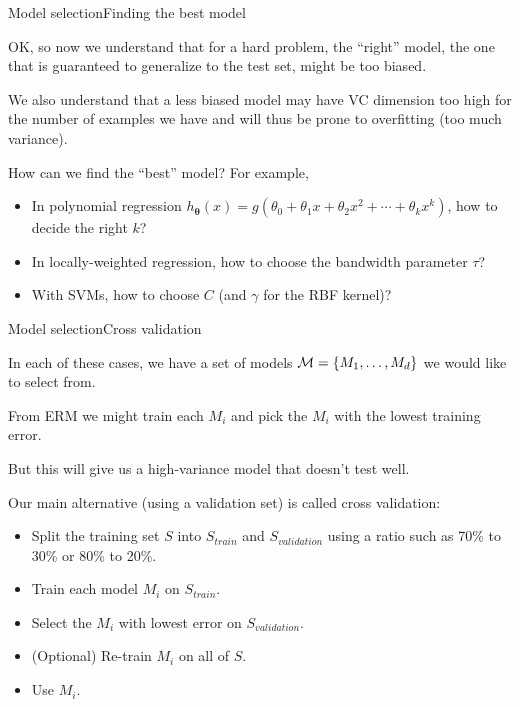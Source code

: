 \documentclass{beamer}
\renewcommand{\vec}[1]{\boldsymbol{#1}}
\begin{document}
\begin{frame}{Model selection}{Finding the best model}

  OK, so now we understand that for a hard problem, the ``right''
  model, the one that is guaranteed to generalize to the test set,
  might be \alert{too biased}.

  \medskip

  We also understand that a less biased model may have VC dimension
  too high for the number of examples we have and will thus be
  \alert{prone to overfitting} (too much variance).

  \medskip
  
  How can we find the ``best'' model? For example,
  \begin{itemize}
  \item In polynomial regression $h_{\vec{\theta}}(x) = g(\theta_0 + \theta_1 x
    + \theta_2 x^2 + \cdots + \theta_k x^k)$, how to decide the right $k$?
  \item In locally-weighted regression, how to choose the bandwidth
    parameter $\tau$?
  \item With SVMs, how to choose $C$ (and $\gamma$ for the RBF
    kernel)?
  \end{itemize}

\end{frame}


\begin{frame}{Model selection}{Cross validation}

  In each of these cases, we have a set of models ${\cal M} = \{ M_1,
  \ldots, M_d\}$ we would like to select from.

  \medskip

  From ERM we might train each $M_i$ and pick the $M_i$ with the lowest
  training error.

  \medskip

  But this will give us a high-variance model that doesn't test well.

  \medskip

  Our main alternative (using a validation set) is called \alert{cross
    validation}:
  \begin{itemize}
  \item Split the training set $S$ into $S_{train}$ and $S_{validation}$ using
    a ratio such as 70\% to 30\% or 80\% to 20\%.
  \item Train each model $M_i$ on $S_{train}$.
  \item Select the $M_i$ with lowest error on $S_{validation}$.
  \item (Optional) Re-train $M_i$ on all of $S$.
  \item Use $M_i$.
  \end{itemize}
  
\end{frame}
\end{document}
